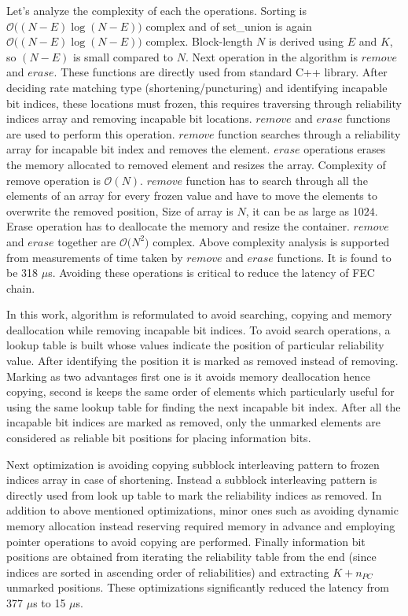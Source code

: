 Let's analyze the complexity of each the operations. Sorting is $\mathcal{O}\big((N-E)\log{}(N-E)\big)$ complex and of set\_union is again $\mathcal{O}\big((N-E)\log{}(N-E)\big)$ complex. Block-length $N$ is derived using $E$ and $K$, so $(N-E)$ is small compared to $N$. Next operation in the algorithm is $remove$ and $erase$. These functions are directly used from standard C++ library. After deciding rate matching type (shortening/puncturing) and identifying incapable bit indices, these locations must frozen, this requires traversing through reliability indices array and removing incapable bit locations. $remove$ and $erase$ functions are used to perform this operation. $remove$ function searches through a reliability array for incapable bit index and removes the element. $erase$ operations erases the memory allocated to removed element and resizes the array. Complexity of remove operation is $\mathcal{O}(N)$. $remove$ function has to search through all the elements of an array for every frozen value and have to move the elements to overwrite the removed position, Size of array is $N$, it can be as large as $1024$. Erase operation has to deallocate the memory and resize the container. $remove$ and $erase$ together are $\mathcal{O}\big(N^2\big)$ complex. Above complexity analysis is supported from measurements of time taken by $remove$ and $erase$ functions. It is found to be 318 $\mu$s. Avoiding these operations is critical to reduce the latency of FEC chain. \newline

In this work, algorithm is reformulated to avoid searching, copying and memory deallocation while removing incapable bit indices. To avoid search operations, a lookup table is built whose values indicate the position of particular reliability value. After identifying the position it is marked as removed instead of removing. Marking as two advantages first one is it avoids memory deallocation hence copying, second is keeps the same order of elements which particularly useful for using the same lookup table for finding the next incapable bit index. After all the incapable bit indices are marked as removed, only the unmarked elements are considered as reliable bit positions for placing information bits.


Next optimization is avoiding copying subblock interleaving pattern to frozen indices array in case of shortening. Instead a subblock interleaving pattern is directly used from look up table to mark the reliability indices as removed. In addition to above mentioned optimizations, minor ones such as avoiding dynamic memory allocation instead reserving required memory in advance and employing pointer operations to avoid copying are performed. Finally information bit positions are obtained from iterating the reliability table from the end (since indices are sorted in ascending order of reliabilities) and extracting $K+n_{PC}$ unmarked positions. These optimizations significantly reduced the latency from 377 $\mu$s to 15 $\mu$s.

